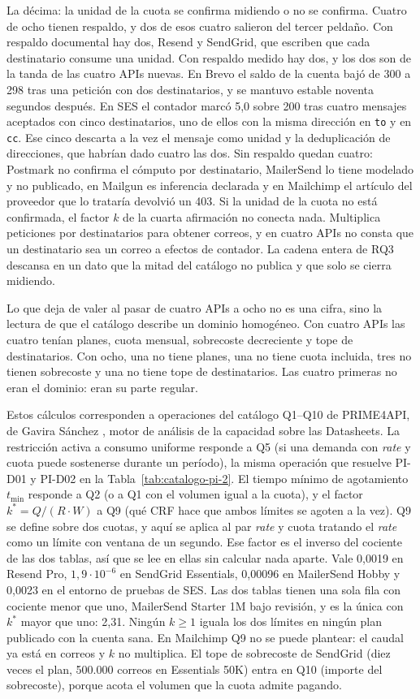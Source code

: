 La décima: la unidad de la cuota se confirma midiendo o no se confirma. Cuatro de ocho tienen respaldo, y dos de esos cuatro salieron del tercer peldaño.
Con respaldo documental hay dos, Resend y SendGrid, que escriben que cada destinatario consume una unidad.
Con respaldo medido hay dos, y los dos son de la tanda de las cuatro APIs nuevas.
En Brevo el saldo de la cuenta bajó de 300 a 298 tras una petición con dos destinatarios, y se mantuvo estable noventa segundos después.
En SES el contador marcó 5,0 sobre 200 tras cuatro mensajes aceptados con cinco destinatarios, uno de ellos con la misma dirección en \texttt{to} y en \texttt{cc}.
Ese cinco descarta a la vez el mensaje como unidad y la deduplicación de direcciones, que habrían dado cuatro las dos.
Sin respaldo quedan cuatro: Postmark no confirma el cómputo por destinatario, MailerSend lo tiene modelado y no publicado, en Mailgun es inferencia declarada y en Mailchimp el artículo del proveedor que lo trataría devolvió un 403.
Si la unidad de la cuota no está confirmada, el factor $k$ de la cuarta afirmación no conecta nada.
Multiplica peticiones por destinatarios para obtener correos, y en cuatro APIs no consta que un destinatario sea un correo a efectos de contador.
La cadena entera de RQ3 descansa en un dato que la mitad del catálogo no publica y que solo se cierra midiendo.

Lo que deja de valer al pasar de cuatro APIs a ocho no es una cifra, sino la lectura de que el catálogo describe un dominio homogéneo.
Con cuatro APIs las cuatro tenían planes, cuota mensual, sobrecoste decreciente y tope de destinatarios.
Con ocho, una no tiene planes, una no tiene cuota incluida, tres no tienen sobrecoste y una no tiene tope de destinatarios.
Las cuatro primeras no eran el dominio: eran su parte regular.

Estos cálculos corresponden a operaciones del catálogo Q1--Q10 de PRIME4API, de Gavira Sánchez \citep{gavira2026tfm}, motor de análisis de la capacidad sobre las Datasheets.
La restricción activa a consumo uniforme responde a Q5 (si una demanda con \textit{rate} y cuota puede sostenerse durante un período), la misma operación que resuelve PI-D01 y PI-D02 en la Tabla~\ref{tab:catalogo-pi-2}.
El tiempo mínimo de agotamiento $t_{\min}$ responde a Q2 (o a Q1 con el volumen igual a la cuota), y el factor $k^{*} = Q/(R \cdot W)$ a Q9 (qué CRF hace que ambos límites se agoten a la vez).
Q9 se define sobre dos cuotas, y aquí se aplica al par \textit{rate} y cuota tratando el \textit{rate} como un límite con ventana de un segundo.
Ese factor es el inverso del cociente de las dos tablas, así que se lee en ellas sin calcular nada aparte.
Vale 0,0019 en Resend Pro, $1{,}9 \cdot 10^{-6}$ en SendGrid Essentials, 0,00096 en MailerSend Hobby y 0,0023 en el entorno de pruebas de SES.
Las dos tablas tienen una sola fila con cociente menor que uno, MailerSend Starter 1M bajo revisión, y es la única con $k^{*}$ mayor que uno: 2,31.
Ningún $k \geq 1$ iguala los dos límites en ningún plan publicado con la cuenta sana.
En Mailchimp Q9 no se puede plantear: el caudal ya está en correos y $k$ no multiplica.
El tope de sobrecoste de SendGrid (diez veces el plan, 500.000 correos en Essentials 50K) entra en Q10 (importe del sobrecoste), porque acota el volumen que la cuota admite pagando.


